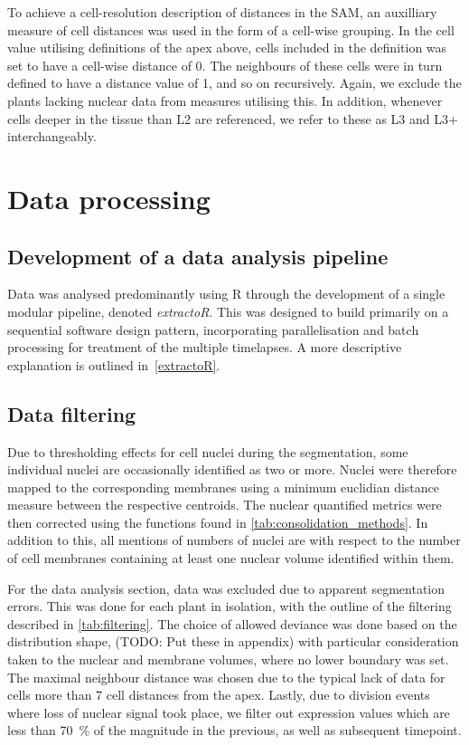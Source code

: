 To achieve a cell-resolution description of distances in the SAM,
an auxilliary measure of cell distances was used in the form of a cell-wise
grouping. In the cell value utilising definitions of the apex above, cells
included in the definition was set to have a cell-wise distance of 0. The
neighbours of these cells were in turn defined to have a distance value of 1,
and so on recursively. Again, we exclude the plants lacking nuclear data from
measures utilising this. In addition, whenever cells deeper in the tissue than L2 are
referenced, we refer to these as L3 and L3$+$ interchangeably.

\section[Data processing]{Data processing}
\label{sec:data_processing}
\subsection[Data analysis tools]{Development of a data analysis pipeline}
\label{sec:pipeline}
Data was analysed predominantly using R through the development of a single
modular pipeline, denoted \textit{extractoR}. This was designed to build 
primarily on a sequential software design pattern,  
incorporating parallelisation and batch processing for treatment of the multiple
timelapses. A more descriptive explanation is outlined in~\cref{extractoR}.

\subsection[Data filtering]{Data filtering}
\label{sec:filtering}
Due to thresholding effects for cell nuclei during the segmentation, some
individual nuclei are occasionally identified as two or more. Nuclei were
therefore mapped to the corresponding membranes using a minimum euclidian distance
measure between the respective centroids. The nuclear quantified metrics were
then corrected using the functions found in \cref{tab:consolidation_methods}. In
addition to this, all mentions of numbers of nuclei are with respect to the
number of cell membranes containing at least one nuclear volume identified
within them.

For the data analysis section, data was excluded due to apparent segmentation
errors. This was done for each plant in isolation, with the outline of the
filtering described in \cref{tab:filtering}. The choice of allowed
deviance was done based on the distribution shape, (TODO: Put these in appendix)
with particular consideration 
taken to the nuclear and membrane volumes, where no lower boundary was set. The
maximal neighbour distance was chosen due to the typical lack of data for cells more
than $7$ cell distances from the apex. Lastly, due to division events where
loss of nuclear signal took place, we filter out expression values which are
less than 70~\% of the magnitude in the previous, as well as subsequent timepoint.

